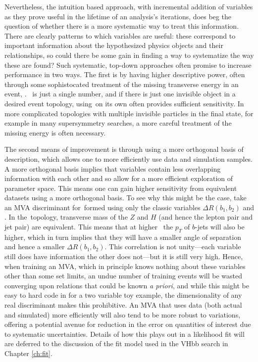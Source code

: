 Nevertheless, the intuition based approach, with incremental addition of variables as they prove useful in the lifetime of an analysis's iterations, does beg the question of whether there is a more systematic way to treat this information.  There are clearly patterns to which variables are useful: these correspond to important information about the hypothesized physics objects and their relationships, so could there be some gain in finding a way to systematize the way these are found?  Such systematic, top-down approaches often promise to increase performance in two ways.  The first is by having higher descriptive power, often through some sophistocated treatment of the missing transverse energy in an event, \met.  \met\, is just a single number, and if there is just one invisible object in a desired event topology, using \met\,on its own often provides sufficient sensitivity.  In more complicated topologies with multiple invisible particles in the final state, for example in many supersymmetry searches, a more careful treatment of the missing energy is often necessary.

  The second means of improvement is through using a more orthogonal basis of description, which allows one to more efficiently use data and simulation samples.  A more orthogonal basis implies that variables contain less overlapping information with each other and so allow for a more efficient exploration of parameter space.  This means one can gain higher sensitivity from equivalent datasets using a more orthogonal basis.  To see why this might be the case, take an MVA discriminant for \ZH\,formed using only the classic variables $\Delta R\left(b_1,b_2\right)$ and \ptv.  In the \ZH\,topology, transverse mass of the $Z$ and $H$ (and hence the lepton pair and jet pair) are equivalent.  This means that at higher \ptv\, the $p_T$ of $b$-jets will also be higher, which in turn implies that they will have a smaller angle of separation and hence a smaller $\Delta R\left(b_1,b_2\right)$.  This correlation is not unity---each variable still does have information the other does not---but it is still very high.  Hence, when training an MVA, which in principle knows nothing about these variables other than some set limits, an undue number of training events will be wasted converging upon relations that could be known \emph{a priori}, and while this might be easy to hard code in for a two variable toy example, the dimensionality of any real discriminant makes this prohibitive.  An MVA that uses data (both actual and simulated) more efficiently will also tend to be more robust to variations, offering a potential avenue for reduction in the error on quantities of interest due to systematic uncertainties.  Details of how this plays out in a likelihood fit will are deferred to the discussion of the fit model used in the VHbb search in Chapter \ref{ch:fit}.

